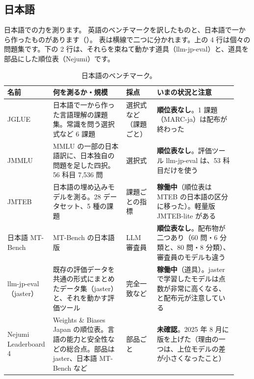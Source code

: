 \subsection{日本語}\label{sec:bm-ja}

日本語での力を測ります。
英語のベンチマークを訳したものと、日本語で一から作ったものがあります（）。
表は横線で二つに分かれます。上の 4 行は個々の問題集です。下の 2 行は、それらを束ねて動かす道具（llm-jp-eval）と、道具を部品にした順位表（Nejumi）です。

\begin{table}[htbp]
\centering\small\setlength{\tabcolsep}{4pt}
\caption{日本語のベンチマーク。}
\label{tab:bm-ja}
\begin{tabular}{@{}>{\raggedright\arraybackslash}p{0.15\linewidth}>{\raggedright\arraybackslash}p{0.31\linewidth}>{\raggedright\arraybackslash}p{0.13\linewidth}>{\raggedright\arraybackslash}p{0.34\linewidth}@{}}
\toprule
名前 & 何を測るか・規模 & 採点 & いまの状況と注意 \\
\midrule
JGLUE \cite{kurihara2022jglue} & 日本語で一から作った言語理解の課題集。常識を問う選択式など 6 課題 & 選択式など（課題ごと） & \textbf{順位表なし}。1 課題（MARC-ja）は配布が終わった \\
\addlinespace[0.2em]
JMMLU \cite{yin2024respect} & MMLU の一部の日本語訳に、日本独自の問題を足した四択。56 科目 7,536 問 & 選択式 & \textbf{順位表なし}。評価ツール llm-jp-eval は、53 科目だけを使う \\
\addlinespace[0.2em]
JMTEB & 日本語の埋め込みモデルを測る。28 データセット、5 種の課題 & 課題ごとの指標 & \textbf{稼働中}（順位表は MTEB の日本語の区分に移った）。軽量版 JMTEB-lite がある \\
\addlinespace[0.2em]
日本語 MT-Bench & MT-Bench の日本語版 & LLM 審査員 & \textbf{順位表なし}。配布物が二つあり（60 問・6 分類と、80 問・8 分類）、審査員のモデルも違う \\
\midrule
llm-jp-eval（jaster） & 既存の評価データを共通の形式にまとめたデータ集（jaster）と、それを動かす評価ツール & 完全一致など & \textbf{稼働中}（道具）。jaster で学習したモデルは点数が非常に高くなる、と配布元が注意している \\
\addlinespace[0.2em]
Nejumi Leaderboard 4 & Weights \& Biases Japan の順位表。言語の能力と安全性などの総合点。部品は jaster、日本語 MT-Bench など & 部品ごと & \textbf{未確認}。2025 年 8 月に版を上げた（理由の一つは、上位モデルの差が小さくなったこと） \\
\bottomrule
\end{tabular}
\end{table}

